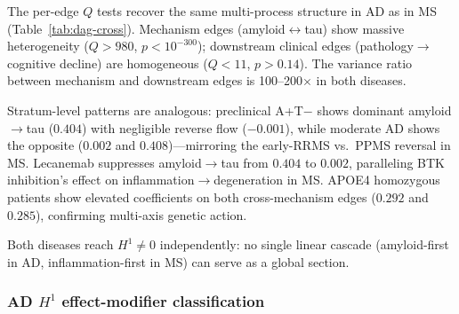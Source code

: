\documentclass{article}
\begin{document}
The per-edge $Q$ tests recover the same multi-process structure in AD as in MS (Table~\ref{tab:dag-cross}).
Mechanism edges (amyloid$\leftrightarrow$tau) show massive heterogeneity ($Q > 980$, $p < 10^{-300}$); downstream clinical edges (pathology$\to$cognitive decline) are homogeneous ($Q < 11$, $p > 0.14$).
The variance ratio between mechanism and downstream edges is 100--200$\times$ in both diseases.

Stratum-level patterns are analogous: preclinical A+T$-$ shows dominant amyloid$\to$tau ($0.404$) with negligible reverse flow ($-0.001$), while moderate AD shows the opposite ($0.002$ and $0.408$)---mirroring the early-RRMS vs.\ PPMS reversal in MS.
Lecanemab suppresses amyloid$\to$tau from $0.404$ to $0.002$, paralleling BTK inhibition's effect on inflammation$\to$degeneration in MS.
APOE4 homozygous patients show elevated coefficients on both cross-mechanism edges ($0.292$ and $0.285$), confirming multi-axis genetic action.

Both diseases reach $H^1 \neq 0$ independently: no single linear cascade (amyloid-first in AD, inflammation-first in MS) can serve as a global section.

\subsubsection{AD $H^1$ effect-modifier classification}
\end{document}
